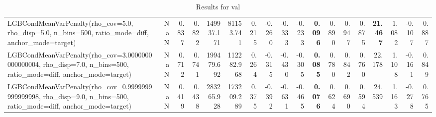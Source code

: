\documentclass[11pt]{article}
\theoremstyle{plain}
\theoremstyle{definition}
\newcommand{\1}{\mathbf{1}}
\begin{document}
\begin{table}[htbp]
{\begin{tabular}{lrrrrrrrrrrrrrrrrr}
LGBCondMeanVarPenalty(rho\_cov=5.0, rho\_disp=5.0, n\_bins=500, ratio\_mode=diff, anchor\_mode=target) & NaN & 0.837 & 0.822 & 149937.171 & 81153.741 & 0.215 & -0.260 & -0.333 & -0.233 & \textbf{0.096} & 0.890 & 0.947 & 0.875 & \textbf{21.467} & 1.082 & -0.107 & 0.887 \\
LGBCondMeanVarPenalty(rho\_cov=3.0000000000000004, rho\_disp=7.0, n\_bins=500, ratio\_mode=diff, anchor\_mode=target) & NaN & 0.712 & 0.741 & 199479.692 & 112282.968 & 0.264 & -0.315 & -0.430 & -0.305 & \textbf{0.085} & 0.780 & 0.842 & 0.760 & 22.178 & 1.108 & -0.161 & 0.849 \\
LGBCondMeanVarPenalty(rho\_cov=0.9999999999999998, rho\_disp=9.0, n\_bins=500, ratio\_mode=diff, anchor\_mode=target) & NaN & 0.419 & 0.438 & 283265.928 & 173209.289 & 0.375 & -0.392 & -0.631 & -0.465 & \textbf{0.076} & 0.624 & 0.690 & 0.594 & 24.539 & 1.163 & -0.278 & 0.765 \\
\bottomrule
\end{tabular}
     }
    \caption{Results for val}
    \label{tab:results_val}
\end{table}
\end{document}
